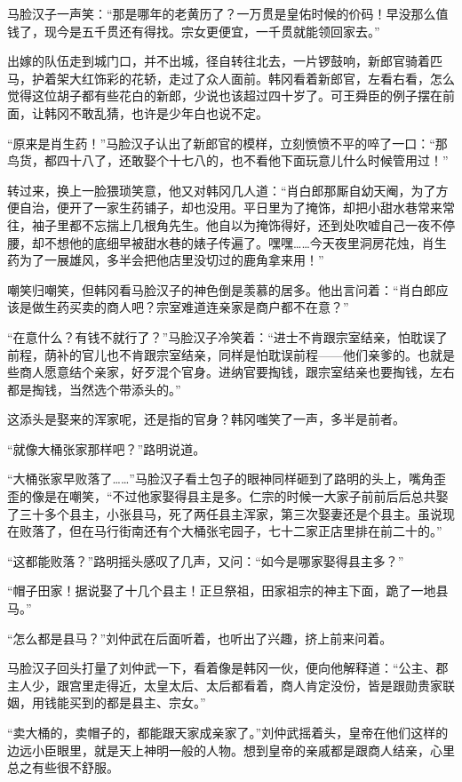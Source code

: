 马脸汉子一声笑：“那是哪年的老黄历了？一万贯是皇佑时候的价码！早没那么值钱了，现今是五千贯还有得找。宗女更便宜，一千贯就能领回家去。”

出嫁的队伍走到城门口，并不出城，径自转往北去，一片锣鼓响，新郎官骑着匹马，护着架大红饰彩的花轿，走过了众人面前。韩冈看着新郎官，左看右看，怎么觉得这位胡子都有些花白的新郎，少说也该超过四十岁了。可王舜臣的例子摆在前面，让韩冈不敢乱猜，也许是少年白也说不定。

“原来是肖生药！”马脸汉子认出了新郎官的模样，立刻愤愤不平的啐了一口：“那鸟货，都四十八了，还敢娶个十七八的，也不看他下面玩意儿什么时候管用过！”

转过来，换上一脸猥琐笑意，他又对韩冈几人道：“肖白郎那厮自幼天阉，为了方便自治，便开了一家生药铺子，却也没用。平日里为了掩饰，却把小甜水巷常来常往，袖子里都不忘揣上几根角先生。他自以为掩饰得好，还到处吹嘘自己一夜不停腰，却不想他的底细早被甜水巷的婊子传遍了。嘿嘿……今天夜里洞房花烛，肖生药为了一展雄风，多半会把他店里没切过的鹿角拿来用！”

嘲笑归嘲笑，但韩冈看马脸汉子的神色倒是羡慕的居多。他出言问着：“肖白郎应该是做生药买卖的商人吧？宗室难道连亲家是商户都不在意？”

“在意什么？有钱不就行了？”马脸汉子冷笑着：“进士不肯跟宗室结亲，怕耽误了前程，荫补的官儿也不肯跟宗室结亲，同样是怕耽误前程——他们亲爹的。也就是些商人愿意结个亲家，好歹混个官身。进纳官要掏钱，跟宗室结亲也要掏钱，左右都是掏钱，当然选个带添头的。”

这添头是娶来的浑家呢，还是指的官身？韩冈嗤笑了一声，多半是前者。

“就像大桶张家那样吧？”路明说道。

“大桶张家早败落了……”马脸汉子看土包子的眼神同样砸到了路明的头上，嘴角歪歪的像是在嘲笑，“不过他家娶得县主是多。仁宗的时候一大家子前前后后总共娶了三十多个县主，小张县马，死了两任县主浑家，第三次娶妻还是个县主。虽说现在败落了，但在马行街南还有个大桶张宅园子，七十二家正店里排在前二十的。”

“这都能败落？”路明摇头感叹了几声，又问：“如今是哪家娶得县主多？”

“帽子田家！据说娶了十几个县主！正旦祭祖，田家祖宗的神主下面，跪了一地县马。”

“怎么都是县马？”刘仲武在后面听着，也听出了兴趣，挤上前来问着。

马脸汉子回头打量了刘仲武一下，看着像是韩冈一伙，便向他解释道：“公主、郡主人少，跟宫里走得近，太皇太后、太后都看着，商人肯定没份，皆是跟勋贵家联姻，用钱能买到的都是县主、宗女。”

“卖大桶的，卖帽子的，都能跟天家成亲家了。”刘仲武摇着头，皇帝在他们这样的边远小臣眼里，就是天上神明一般的人物。想到皇帝的亲戚都是跟商人结亲，心里总之有些很不舒服。


